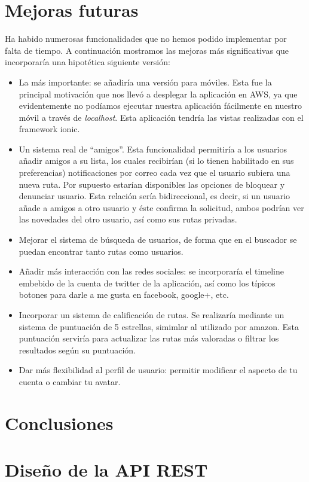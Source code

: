 \documentclass[11pt,a4paper]{article}
\begin{document}
\section{Mejoras futuras}
Ha habido numerosas funcionalidades que no hemos podido implementar por falta de tiempo. A continuación mostramos las mejoras más significativas que incorporaría una hipotética siguiente versión:
\begin{itemize}
\item La más importante: se añadiría una versión para móviles. Esta fue la principal motivación que nos llevó a desplegar la aplicación en AWS, ya que evidentemente no podíamos ejecutar nuestra aplicación fácilmente en nuestro móvil a través de \textit{localhost}. Esta aplicación tendría las vistas realizadas con el framework ionic.
\item Un sistema real de ``amigos''. Esta funcionalidad permitiría a los usuarios añadir amigos a su lista, los cuales recibirían (si lo tienen habilitado en sus preferencias) notificaciones por correo cada vez que el usuario subiera una nueva ruta. Por supuesto estarían disponibles las opciones de bloquear y denunciar usuario. Esta relación sería bidireccional, es decir, si un usuario añade a amigos a otro usuario y éste confirma la solicitud, ambos podrían ver las novedades del otro usuario, así como sus rutas privadas.
\item Mejorar el sistema de búsqueda de usuarios, de forma que en el buscador se puedan encontrar tanto rutas como usuarios.
\item Añadir más interacción con las redes sociales: se incorporaría el timeline embebido de la cuenta de twitter de la aplicación, así como los típicos botones para darle a me gusta en facebook, google+, etc.
\item Incorporar un sistema de calificación de rutas. Se realizaría mediante un sistema de puntuación de 5 estrellas, simimlar al utilizado por amazon. Esta puntuación serviría para actualizar las rutas más valoradas o filtrar los resultados según su puntuación.
\item Dar más flexibilidad al perfil de usuario: permitir modificar el aspecto de tu cuenta o cambiar tu avatar.
\end{itemize} 
\section{Conclusiones}

\appendix
\section{Diseño de la API REST}
\end{document}
